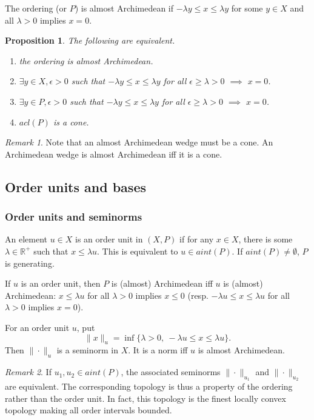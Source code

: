 \documentclass[12pt]{article}
\newtheorem{prop}{Proposition}
\theoremstyle{remark}
\newtheorem{rem}{Remark}
\newcommand{\<}{\langle}
\begin{document}
The ordering (or $P$) is almost Archimedean if $-\lambda y\le x\le \lambda y$ for some $y\in X$ and  all $\lambda> 0$ implies  $x=0$.

\begin{prop}
The following are equivalent.
\begin{enumerate}
\item[(i)] the ordering is almost Archimedean.
\item[(ii)]  $\exists y\in X, \epsilon >0$ such that  $-\lambda y\le x\le \lambda y$ for all $\epsilon\ge \lambda>0$ $\implies$ $x= 0$.
\item[(iii)] $\exists y\in P, \epsilon >0$ such that  $-\lambda y\le x\le \lambda y$ for all $\epsilon\ge \lambda>0$ $\implies$ $x= 0$.
\item[(iv)] $acl(P)$ is a cone.
\end{enumerate}
\end{prop}

\begin{rem}
Note that an almost Archimedean wedge must be a cone. An Archimedean  wedge is almost Archimedean iff it is a cone.
\end{rem}

\subsection{Order units and bases}


\subsubsection*{Order units and seminorms}

 An element $u\in X$ is an order unit in $(X,P)$ if for any $x\in X$, there is some $\lambda\in \mathbb R^+$ such that 
 $x\le \lambda u$. This is equivalent to $u\in aint(P)$. If $aint(P)\ne \emptyset$, $P$ is generating.  

If $u$ is an order unit, then $P$ is (almost) Archimedean iff 
$u$ is (almost) Archimedean: $x\le \lambda u$ for all $\lambda>0$ implies $x\le 0$ (resp. $-\lambda u\le x\le \lambda u$ for all $\lambda>0$ implies $x=0$). 



For an order unit $u$, put
 \[
\|x\|_u=\inf\{\lambda>0,\ -\lambda u\le x\le \lambda u\}.
 \]
Then $\|\cdot\|_u$ is a seminorm in $X$. It is a norm iff  $u$ is almost Archimedean. 

\begin{rem}
If $u_1,u_2\in aint(P)$, the associated seminorms $\|\cdot\|_{u_1}$ and $\|\cdot\|_{u_2}$ are equivalent. The corresponding topology is thus a property of the ordering rather than the order unit. In fact, this topology is the finest locally convex topology 
 making all order intervals bounded.
\end{rem}
 
\end{document}
